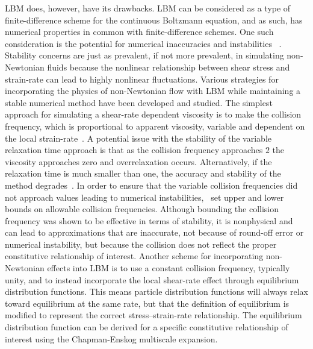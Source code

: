 LBM does, however, have its drawbacks.
LBM can be considered as a type of finite-difference scheme for the continuous Boltzmann equation, and as such, has numerical properties in common with finite-difference schemes.
One such consideration is the potential for numerical inaccuracies and instabilities ~\cite{sterling1993stability,sterling1996stability,bawazeer2013stability,lallemand2000theory}.
Stability concerns are just as prevalent, if not more prevalent, in simulating non-Newtonian fluids because the nonlinear relationship between shear stress and strain-rate can lead to highly nonlinear fluctuations.
Various strategies for incorporating the physics of non-Newtonian flow with LBM while maintaining a stable numerical method have been developed and studied.
The simplest approach for simulating a shear-rate dependent viscosity is to make the collision frequency, which is proportional to apparent viscosity, variable and dependent on the local strain-rate~\cite{boyd2006second,chen2014simulations,fallah2012multiple,tang2011bingham,svec2011flow,svec2012free,zhao2016lattice}.
A potential issue with the stability of the variable relaxation time approach is that as the collision frequency approaches $2$ the viscosity approaches zero and overrelaxation occurs.
Alternatively, if the relaxation time is much smaller than one, the accuracy and stability of the method degrades~\cite{latt2007hydrodynamic}. 
In order to ensure that the variable collision frequencies did not approach values leading to numerical instabilities,~\cite{svec2011flow,svec2012free,gabbanelli2005lattice} set upper and lower bounds on allowable collision frequencies.
Although bounding the collision frequency was shown to be effective in terms of stability, it is nonphysical and can lead to approximations that are inaccurate, not because of round-off error or numerical instability, but because the collision does not reflect the proper constitutive relationship of interest.
Another scheme for incorporating non-Newtonian effects into LBM is to use a constant collision frequency, typically unity, and to instead incorporate the local shear-rate effect through equilibrium distribution functions.
This means particle distribution functions will always relax toward equilibrium at the same rate, but that the definition of equilibrium is modified to represent the correct stress--strain-rate relationship.
The equilibrium distribution function can be derived for a specific constitutive relationship of interest using the Chapman-Enskog multiscale expansion.

